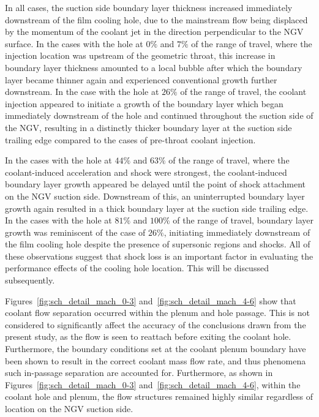 \documentclass[a4paper, 11pt, oneside]{report}
\begin{document}
In all cases, the suction side boundary layer thickness increased immediately downstream of the film cooling hole, due to the mainstream flow being displaced by the momentum of the coolant jet in the direction perpendicular to the NGV surface. In the cases with the hole at $0\%$ and $7\%$ of the range of travel, where the injection location was upstream of the geometric throat, this increase in boundary layer thickness amounted to a local bubble after which the boundary layer became thinner again and experienced conventional growth further downstream. In the case with the hole at $26\%$ of the range of travel, the coolant injection appeared to initiate a growth of the boundary layer which began immediately downstream of the hole and continued throughout the suction side of the NGV, resulting in a distinctly thicker boundary layer at the suction side trailing edge compared to the cases of pre-throat coolant injection.

In the cases with the hole at $44\%$ and $63\%$ of the range of travel, where the coolant-induced acceleration and shock were strongest, the coolant-induced boundary layer growth appeared be delayed until the point of shock attachment on the NGV suction side. Downstream of this, an uninterrupted boundary layer growth again resulted in a thick boundary layer at the suction side trailing edge. In the cases with the hole at $81\%$ and $100\%$ of the range of travel, boundary layer growth was reminiscent of the case of $26\%$, initiating immediately downstream of the film cooling hole despite the presence of supersonic regions and shocks. All of these observations suggest that shock loss is an important factor in evaluating the performance effects of the cooling hole location. This will be discussed subsequently.

Figures~\ref{fig:sch_detail_mach_0-3} and~\ref{fig:sch_detail_mach_4-6} show that coolant flow separation occurred within the plenum and hole passage. This is not considered to significantly affect the accuracy of the conclusions drawn from the present study, as the flow is seen to reattach before exiting the coolant hole. Furthermore, the boundary conditions set at the coolant plenum boundary have been shown to result in the correct coolant mass flow rate, and thus phenomena such in-passage separation are accounted for. Furthermore, as shown in Figures~\ref{fig:sch_detail_mach_0-3} and~\ref{fig:sch_detail_mach_4-6}, within the coolant hole and plenum, the flow structures remained highly similar regardless of location on the NGV suction side.
\end{document}
